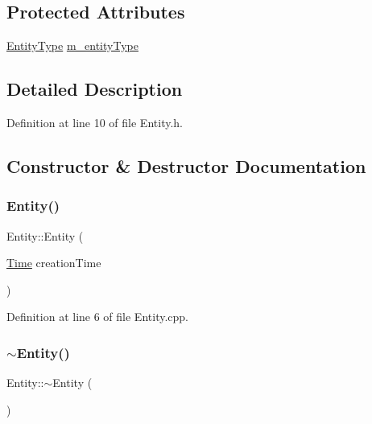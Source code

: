\subsection*{Protected Attributes}
\begin{DoxyCompactItemize}
\item 
\hyperlink{_entity_8h_ad79a57ed3105eb60d991a1aeb4a9dc44}{Entity\+Type} \hyperlink{class_entity_a3431bdb8f5536c20eba5391e97e5ca8e}{m\+\_\+entity\+Type}
\end{DoxyCompactItemize}


\subsection{Detailed Description}


Definition at line 10 of file Entity.\+h.



\subsection{Constructor \& Destructor Documentation}
\mbox{\label{class_entity_afb6488f2bb29b3e730459246e005dacd}} 
\subsubsection{\texorpdfstring{Entity()}{Entity()}}
{\footnotesize\ttfamily Entity\+::\+Entity (\begin{DoxyParamCaption}\item[{\hyperlink{_simulation_executive_8h_ac2d3e0ba793497bcca555c7c2cf64ff3}{Time}}]{creation\+Time }\end{DoxyParamCaption})}



Definition at line 6 of file Entity.\+cpp.

\mbox{\label{class_entity_adf6d3f7cb1b2ba029b6b048a395cc8ae}} 
\subsubsection{\texorpdfstring{$\sim$\+Entity()}{~Entity()}}
{\footnotesize\ttfamily Entity\+::$\sim$\+Entity (\begin{DoxyParamCaption}{ }\end{DoxyParamCaption})\hspace{0.3cm}{\ttfamily [inline]}}



